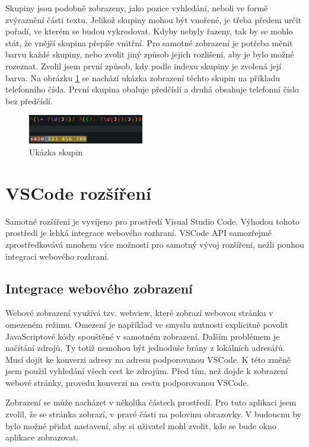Skupiny jsou podobně zobrazeny, jako pozice vyhledání, neboli ve formě zvýraznění části textu.
Jelikož skupiny mohou být vnořené, je třeba předem určit pořadí, ve kterém se budou vykreslovat.
Kdyby nebyly řazeny, tak by se mohlo stát, že vnější skupina přepíše vnitřní.
Pro samotné zobrazení je potřeba měnit barvu každé skupiny, nebo zvolit jiný způsob jejich rozlišení, aby je bylo možné rozeznat.
Zvolil jsem první způsob, kdy podle indexu skupiny je zvolená její barva.
Na obrázku \ref{fig:groupShowcase} se nachází ukázka zobrazení těchto skupin na příkladu telefonního čísla.
První skupina obaluje předčíslí a druhá obsahuje telefonní číslo bez předčíslí.

\begin{figure}[!h]
	\centering
	\includegraphics[width=0.45\textwidth]{Figures/groupShowcase.png}
	\caption{Ukázka skupin}
	\label{fig:groupShowcase}
\end{figure} 

\section{VSCode rozšíření}

Samotné rozšíření je vyvíjeno pro prostředí Visual Studio Code.
Výhodou tohoto prostředí je lehká integrace webového rozhraní.
VSCode API samozřejmě zprostředkovává mnohem více možností pro samotný vývoj rozšíření, nežli pouhou integraci webového rozhraní.

\subsection*{Integrace webového zobrazení}

Webové zobrazení využívá tzv. webview, které zobrazí webovou stránku v omezeném režimu.
Omezení je například ve smyslu nutnosti explicitně povolit JavaScriptové kódy spouštěné v samotném zobrazení.
Dalším problémem je načítání zdrojů.
Ty totiž nemohou být jednoduše brány z lokálních adresářů. 
Musí dojít ke konverzi adresy na adresu podporovanou VSCode. 
K této změně jsem použil vyhledání všech cest ke zdrojům.
Před tím, než dojde k zobrazení webové stránky, provedu konverzi na cestu podporovanou VSCode.

Zobrazení se může nacházet v několika částech prostředí.
Pro tuto aplikaci jsem zvolil, že se stránka zobrazí, v pravé části na polovinu obrazovky.
V budoucnu by bylo možné přidat nastavení, aby si uživatel mohl zvolit, kde se bude okno aplikace zobrazovat.

